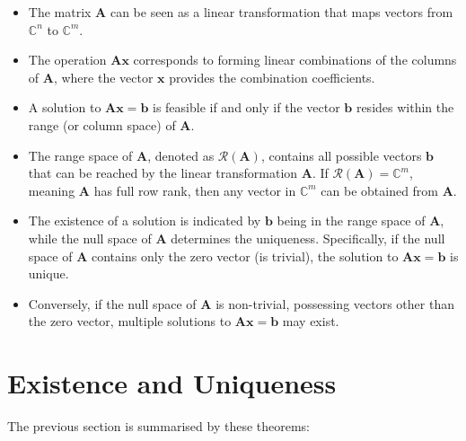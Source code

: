 \begin{itemize}
    \item The matrix \( \mathbf{A} \) can be seen as a linear transformation that maps vectors from \( \mathbb{C}^n \) to \( \mathbb{C}^m \).
    \item The operation \( \mathbf{Ax} \) corresponds to forming linear combinations of the columns of \( \mathbf{A} \), where the vector \( \mathbf{x} \) provides the combination coefficients.
    \item A solution to \( \mathbf{Ax} = \mathbf{b} \) is feasible if and only if the vector \( \mathbf{b} \) resides within the range (or column space) of \( \mathbf{A} \).
    \item The range space of \( \mathbf{A} \), denoted as \( \mathcal{R}(\mathbf{A}) \), contains all possible vectors \( \mathbf{b} \) that can be reached by the linear transformation \( \mathbf{A} \). If \( \mathcal{R}(\mathbf{A}) = \mathbb{C}^m \), meaning \( \mathbf{A} \) has full row rank, then any vector in \( \mathbb{C}^m \) can be obtained from \( \mathbf{A} \).
    \item {\color{green!55!blue}The existence of a solution is indicated by \( \mathbf{b} \) being in the range space of \( \mathbf{A} \), while the null space of \( \mathbf{A} \) determines the uniqueness. Specifically, if the null space of \( \mathbf{A} \) contains only the zero vector (is trivial), the solution to \( \mathbf{Ax} = \mathbf{b} \) is unique.}
    \item {\color{green!55!blue}Conversely, if the null space of \( \mathbf{A} \) is non-trivial, possessing vectors other than the zero vector, multiple solutions to \( \mathbf{Ax} = \mathbf{b} \) may exist.}
\end{itemize}


\section{Existence and Uniqueness}
The previous section is summarised by these theorems:

